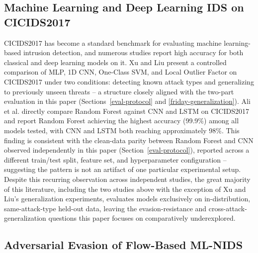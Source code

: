 \documentclass[conference]{IEEEtran}
\begin{document}
\subsection{Machine Learning and Deep Learning IDS on CICIDS2017}
 
CICIDS2017 \cite{sharafaldin2018cicids} has become a standard benchmark for evaluating machine learning-based intrusion detection, and numerous studies report high accuracy for both classical and deep learning models on it. Xu and Liu \cite{xu2025robust} present a controlled comparison of MLP, 1D CNN, One-Class SVM, and Local Outlier Factor on CICIDS2017 under two conditions: detecting known attack types and generalizing to previously unseen threats -- a structure closely aligned with the two-part evaluation in this paper (Sections~\ref{eval-protocol} and \ref{friday-generalization}). Ali et al. \cite{ali2025deep} directly compare Random Forest against CNN and LSTM on CICIDS2017 and report Random Forest achieving the highest accuracy (99.9\%) among all models tested, with CNN and LSTM both reaching approximately 98\%. This finding is consistent with the clean-data parity between Random Forest and CNN observed independently in this paper (Section~\ref{eval-protocol}), reported across a different train/test split, feature set, and hyperparameter configuration -- suggesting the pattern is not an artifact of one particular experimental setup. Despite this recurring observation across independent studies, the great majority of this literature, including the two studies above with the exception of Xu and Liu's generalization experiments, evaluates models exclusively on in-distribution, same-attack-type held-out data, leaving the evasion-resistance and cross-attack-generalization questions this paper focuses on comparatively underexplored.
 
\subsection{Adversarial Evasion of Flow-Based ML-NIDS}
 
\end{document}
